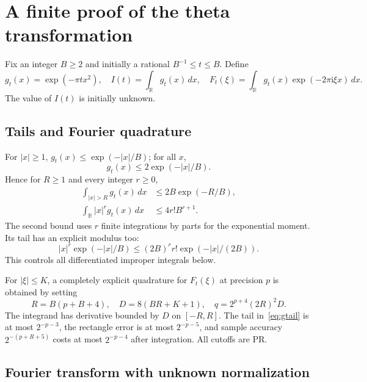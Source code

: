 \documentclass[11pt,letterpaper]{article}
\numberwithin{equation}{section}
\theoremstyle{definition}
\newcommand{\R}{\mathbb R}
\newcommand{\ii}{\mathrm i}
\begin{document}
\section{A finite proof of the theta transformation}\label{sec:theta}

Fix an integer \(B\ge2\) and initially a rational
\(B^{-1}\le t\le B\). Define
\begin{equation}
 g_t(x)=\exp(-\pi t x^2),\quad
 I(t)=\int_\R g_t(x)\,dx,\quad
 F_t(\xi)=\int_\R g_t(x)\exp(-2\pi\ii\xi x)\,dx.
 \label{eq:Fourierdef}
\end{equation}
The value of \(I(t)\) is initially unknown.

\subsection{Tails and Fourier quadrature}

For \(|x|\ge1\), \(g_t(x)\le\exp(-|x|/B)\); for all \(x\),
\[
 g_t(x)\le2\exp(-|x|/B).
\]
Hence for \(R\ge1\) and every integer \(r\ge0\),
\begin{align}
 \int_{|x|>R}g_t(x)\,dx
       &\le2B\exp(-R/B),                                  \label{eq:gtail}\\
 \int_\R |x|^r g_t(x)\,dx
       &\le4r!B^{r+1}.                                    \label{eq:moments}
\end{align}
The second bound uses \(r\) finite integrations by parts for the
exponential moment. Its tail has an explicit modulus too:
\begin{equation}
 |x|^r\exp(-|x|/B)
       \le(2B)^r r!\exp(-|x|/(2B)).
 \label{eq:momenttail}
\end{equation}
This controls all differentiated improper integrals below.

For \(|\xi|\le K\), a completely explicit quadrature for \(F_t(\xi)\)
at precision \(p\) is obtained by setting
\begin{equation}
 R=B(p+B+4),\quad D=8(BR+K+1),\quad
 q=2^{p+4}(2R)^2D.
 \label{eq:fouriercutoffs}
\end{equation}
The integrand has derivative bounded by \(D\) on \([-R,R]\).
The tail in~\eqref{eq:gtail} is at most \(2^{-p-3}\), the
rectangle error is at most \(2^{-p-5}\), and sample accuracy
\(2^{-(p+R+5)}\) costs at most \(2^{-p-4}\) after integration.
All cutoffs are PR.

\subsection{Fourier transform with unknown normalization}
\end{document}
